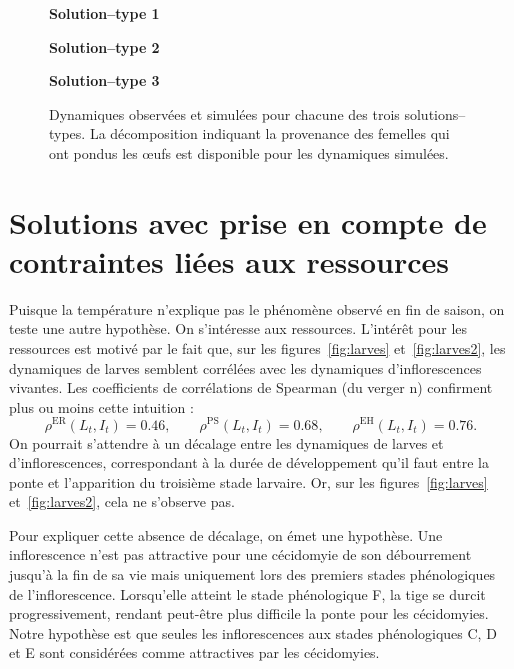 \begin{figure}[h]
 \centering
 \textbf{Solution--type 1}
 
 
 \textbf{Solution--type 2}
 
 
 \textbf{Solution--type 3}
 
 \caption{Dynamiques observées et simulées pour chacune des trois solutions--types. La décomposition indiquant la provenance des femelles qui ont pondus les œufs est disponible pour les dynamiques simulées.}
 \label{fig:B}
\end{figure}

\clearpage
\section{Solutions avec prise en compte de contraintes liées aux ressources}
\label{chap:cde}

Puisque la température n'explique pas le phénomène observé en fin de saison, on teste une autre hypothèse.
On s'intéresse aux ressources.
L'intérêt pour les ressources est motivé par le fait que, sur les figures~\ref{fig:larves} et~\ref{fig:larves2}, les dynamiques de larves semblent corrélées avec les dynamiques d'inflorescences vivantes.
Les coefficients de corrélations de Spearman (du verger n) confirment plus ou moins cette intuition :
\[
\rho^{\text{ER}}\left( L_t, I_t  \right) =0.46,  \qquad \rho^{\text{PS}}\left( L_t, I_t  \right) =0.68, \qquad \rho^{\text{EH}}\left( L_t, I_t  \right) =0.76.
\]
On pourrait s'attendre à un décalage entre les dynamiques de larves et d'inflorescences, correspondant à la durée de développement qu'il faut entre la ponte et l'apparition du troisième stade larvaire.
Or, sur les figures~\ref{fig:larves} et~\ref{fig:larves2}, cela ne s'observe pas.

Pour expliquer cette absence de décalage, on émet une hypothèse.
Une inflorescence n'est pas attractive pour une cécidomyie de son débourrement jusqu'à la fin de sa vie mais uniquement lors des premiers stades phénologiques de l'inflorescence.
Lorsqu'elle atteint le stade phénologique F, la tige se durcit progressivement, rendant peut-être plus difficile la ponte pour les cécidomyies.
Notre hypothèse est que seules les inflorescences aux stades phénologiques C, D et E sont considérées comme attractives par les cécidomyies.

